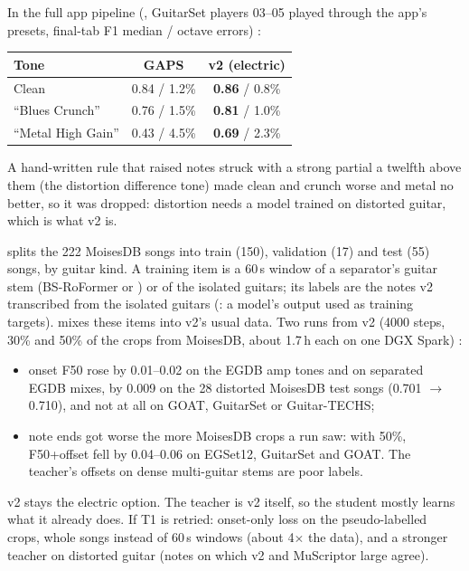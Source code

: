 In the full app pipeline (, GuitarSet players 03--05 played
through the app's presets, final-tab F1 median / octave errors) \measured:
\begin{center}
\small
\begin{tabular}{@{}lcc@{}}
\toprule
Tone & GAPS & v2 (electric) \\
\midrule
Clean & 0.84 / 1.2\% & \textbf{0.86} / 0.8\% \\
``Blues Crunch'' & 0.76 / 1.5\% & \textbf{0.81} / 1.0\% \\
``Metal High Gain'' & 0.43 / 4.5\% & \textbf{0.69} / 2.3\% \\
\bottomrule
\end{tabular}
\end{center}
A hand-written rule that raised notes struck with a strong partial a twelfth
above them (the distortion difference tone) made clean and crunch worse and
metal no better, so it was dropped: distortion needs a model trained on
distorted guitar, which is what v2 is.

\begin{inapp}
 splits the 222 MoisesDB songs
into train (150), validation (17) and test (55) songs, by guitar kind. A
training item is a 60\,s window of a separator's guitar stem (BS-RoFormer or
) or of the isolated guitars; its labels are the notes v2
transcribed from the isolated guitars (: a model's output
used as training targets).  mixes these
items into v2's usual data. Two runs from v2 (4000 steps, 30\% and 50\% of the
crops from MoisesDB, about 1.7\,h each on one DGX Spark) \measured:
\begin{itemize}
\item onset F50 rose by 0.01--0.02 on the EGDB amp tones and on separated
  EGDB mixes, by 0.009 on the 28 distorted MoisesDB test songs (0.701 $\to$
  0.710), and not at all on GOAT, GuitarSet or Guitar-TECHS;
\item note ends got worse the more MoisesDB crops a run saw: with 50\%,
  F50+offset fell by 0.04--0.06 on EGSet12, GuitarSet and GOAT. The teacher's
  offsets on dense multi-guitar stems are poor labels.
\end{itemize}
v2 stays the electric option. The teacher is v2 itself, so the student mostly
learns what it already does. If T1 is retried:
onset-only loss on the pseudo-labelled crops, whole songs instead of 60\,s
windows (about 4$\times$ the data), and a stronger teacher on distorted guitar
(notes on which v2 and MuScriptor large agree).
\end{inapp}

